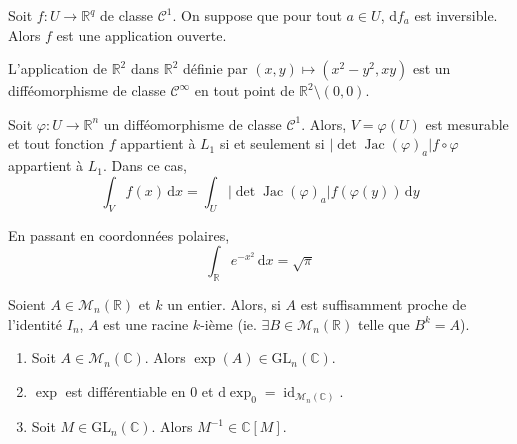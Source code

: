   \begin{corollary}
    Soit $f : U \rightarrow \mathbb{R}^q$ de classe $\mathcal{C}^1$. On suppose que pour tout $a \in U$, $\mathrm{d}f_a$ est inversible. Alors $f$ est une application ouverte.
  \end{corollary}


  \begin{example}
    L'application de $\mathbb{R}^2$ dans $\mathbb{R}^2$ définie par $(x, y) \mapsto (x^2-y^2, xy)$ est un difféomorphisme de classe $\mathcal{C}^\infty$ en tout point de $\mathbb{R}^2 \setminus (0,0)$.
  \end{example}


  \begin{application}
    Soit $\varphi : U \rightarrow \mathbb{R}^n$ un difféomorphisme de classe $\mathcal{C}^1$. Alors, $V = \varphi(U)$ est mesurable et tout fonction $f$ appartient à $L_1$ si et seulement si $\vert \det \operatorname{Jac}(\varphi)_a \vert f \circ \varphi$ appartient à $L_1$. Dans ce cas,
    \[ \int_V f(x) \, \mathrm{d}x = \int_U \vert \det \operatorname{Jac}(\varphi)_a \vert f (\varphi(y)) \, \mathrm{d}y \]
  \end{application}


  \begin{example}
    En passant en coordonnées polaires,
    \[ \int_{\mathbb{R}} e^{-x^2} \, \mathrm{d}x = \sqrt{\pi} \]
  \end{example}


  \begin{application}
    Soient $A \in \mathcal{M}_n(\mathbb{R})$ et $k$ un entier. Alors, si $A$ est suffisamment proche de l'identité $I_n$, $A$ est une racine $k$-ième (ie. $\exists B \in \mathcal{M}_n(\mathbb{R})$ telle que $B^k = A$).
  \end{application}


  \begin{lemma}
    \begin{enumerate}[label=(\roman*)]
      \item Soit $A \in \mathcal{M}_n(\mathbb{C})$. Alors $\exp(A) \in \mathrm{GL}_n(\mathbb{C})$.
      \item $\exp$ est différentiable en $0$ et $\mathrm{d}\exp_0 = \operatorname{id}_{\mathcal{M}_n(\mathbb{C})}$.
      \item Soit $M \in \mathrm{GL}_n(\mathbb{C})$. Alors $M^{-1} \in \mathbb{C}[M]$.
    \end{enumerate}
  \end{lemma}

